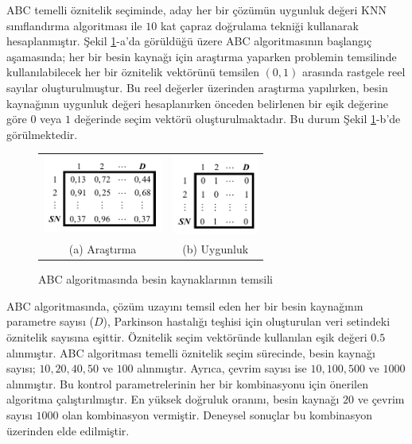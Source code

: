 \documentclass[conference]{IEEEtran}
\begin{document}
ABC temelli öznitelik seçiminde, aday her bir çözümün uygunluk değeri KNN sınıflandırma algoritması ile $10$ kat çapraz doğrulama tekniği kullanarak hesaplanmıştır. Şekil \ref{fig:RepFoods}-a'da görüldüğü üzere ABC algoritmasının başlangıç aşamasında; her bir besin kaynağı için araştırma yaparken problemin temsilinde kullanılabilecek her bir öznitelik vektörünü temsilen $(0,1)$ arasında rastgele reel sayılar oluşturulmuştur. Bu reel değerler üzerinden araştırma yapılırken, besin kaynağının uygunluk değeri hesaplanırken önceden belirlenen bir eşik değerine göre $0$ veya $1$ değerinde seçim vektörü oluşturulmaktadır. Bu durum Şekil \ref{fig:RepFoods}-b'de görülmektedir.
%
\begin{figure}[!h]
	\centering%
	\begin{center}
		\begin{tabular}{cc}%
			\includegraphics[height=2.5cm]{figures/m1.pdf}&%
			
			\includegraphics[height=2.6cm]{figures/m2.pdf}\\%
			(a) Araştırma&  (b) Uygunluk \\%
		\end{tabular}%
	\end{center}
	\caption{ABC algoritmasında besin kaynaklarının temsili}%
	\label{fig:RepFoods}
\end{figure}
%
ABC algoritmasında, çözüm uzayını temsil eden her bir besin kaynağının parametre sayısı ($D$), Parkinson hastalığı teşhisi için oluşturulan veri setindeki öznitelik sayısına eşittir. Öznitelik seçim vektöründe kullanılan eşik değeri $0.5$ alınmıştır. ABC algoritması temelli öznitelik seçim sürecinde, besin kaynağı sayısı; $10, 20, 40, 50$ ve $100$ alınmıştır. Ayrıca, çevrim sayısı ise $10, 100, 500$ ve $1000$ alınmıştır. Bu kontrol parametrelerinin her bir kombinasyonu için önerilen algoritma çalıştırılmıştır. En yüksek doğruluk oranını, besin kaynağı $20$ ve çevrim sayısı $1000$ olan kombinasyon vermiştir. Deneysel sonuçlar bu kombinasyon üzerinden elde edilmiştir.
\end{document}
